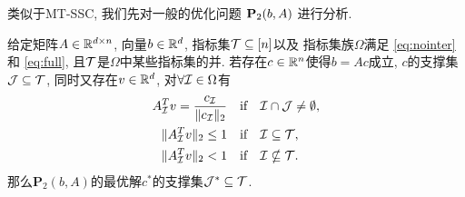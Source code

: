 类似于MT-SSC, 我们先对一般的优化问题 $\mathbf{P}_2(b,A)$ 进行分析.
\begin{lemma}\label{lem:prim_dual}
  给定矩阵$A\in\mathbb{R}^{d\times n}$, 向量$b\in \mathbb{R}^d$, 指标集$\mathcal{T}\subseteq [n]$以及
  指标集族$\Omega$满足 \eqref{eq:nointer} 和 \eqref{eq:full},  
  且$\mathcal{T}$是$\Omega$中某些指标集的并.
  若存在$c\in \mathbb{R}^n $使得$b = Ac$成立, $c$的支撑集$\mathcal{J} \subseteq \mathcal{T}$,
  同时又存在$v\in\mathbb{R}^d$, 对$\forall \mathcal{I} \in \Omega$有
  \begin{align}
    A^T_{\mathcal{I}} v= \frac{c_{\mathcal{I}}}{\|c_{\mathcal{I}}\|_2} \quad& \text{if}\quad \mathcal{I} \cap \mathcal{J} \neq
    \emptyset,\label{eq:group_c1}\\
    \|A^T_{\mathcal{I}} v\|_2 \le  1 \quad &\text{if}\quad \mathcal{I} \subseteq \mathcal{T},\label{eq:group_c2} \\
    \|A^T_{\mathcal{I}} v\|_2< 1\quad &\text{if}\quad \mathcal{I} \nsubseteq \mathcal{T}\label{eq:group_c3}.
  \end{align}
  那么$\mathbf{P}_2(b,A)$的最优解$c^*$的支撑集$\mathcal{J}^*\subseteq \mathcal{T}$.
\end{lemma}
